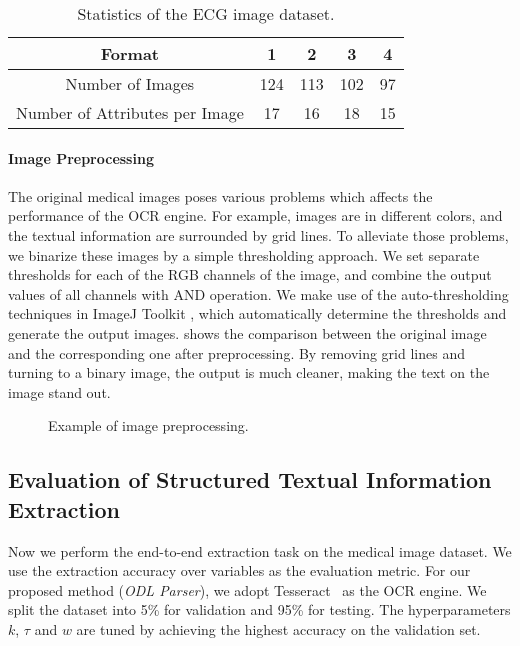 \begin{table}[ht]
\centering
\caption{Statistics of the ECG image dataset.}
\label{tab:statis}
\begin{tabular}{|c|c|c|c|c|}
\hline
Format & 1 & 2 & 3 & 4\\
\hline \hline
Number of Images & 124 & 113 & 102 & 97\\
\hline
Number of Attributes per Image & 17 & 16 & 18 & 15 \\
\hline
\end{tabular}
\end{table}

\paragraph{Image Preprocessing}
The original medical images poses various problems
which affects the performance of the OCR engine.
For example, images are in different colors,
and the textual information are surrounded by grid lines.
To alleviate those problems, we binarize these images
by a simple thresholding approach.
We set separate thresholds for each of the RGB channels of the image,
and combine the output values of all channels with AND operation.
We make use of the auto-thresholding techniques in ImageJ Toolkit \cite{schneider2012nih},
which automatically determine the thresholds and generate the output images.
 shows the comparison between the original image
and the corresponding one after preprocessing.
By removing grid lines and turning to a binary image,
the output is much cleaner, making the text on the image stand out.

\begin{figure}[ht]
\centering
{}
\hfill
{}
\caption{Example of image preprocessing.}
\label{fig:preprocess}
\end{figure}


\subsection{Evaluation of Structured Textual Information Extraction}
Now we perform the end-to-end extraction task on
the medical image dataset.
We use the extraction accuracy over variables as the evaluation metric.
For our proposed method (\textit{ODL Parser}),
we adopt Tesseract~\cite{smith2007overview} as the OCR engine.
We split the dataset into 5\% for validation and 95\% for testing.
The hyperparameters $k$, $\tau$ and $w$ are tuned by achieving the
highest accuracy on the validation set.

